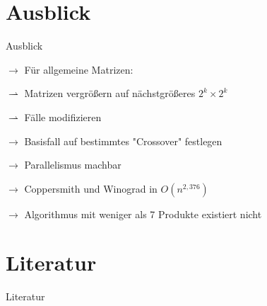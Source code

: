\documentclass[aspectratio=169]{beamer}
\begin{document}
\section{Ausblick}
\begin{frame}{Ausblick}\uncover<+-> {

    $\rightarrow$ Für allgemeine Matrizen:
    
    \qquad $\rightharpoonup$ Matrizen vergrößern auf nächstgrößeres $2^k \times 2^k$
    
    \qquad $\rightharpoonup$ Fälle modifizieren}
    \uncover<+-> {
    
    \bigskip
    $\rightarrow$ Basisfall auf bestimmtes "Crossover" festlegen
    
    \bigskip
    }
    \uncover<+-> {
    
    $\rightarrow$ Parallelismus machbar
    }
    \bigskip
    \uncover<+-> {
    
    $\rightarrow$ Coppersmith und Winograd in $O(n^{2,376})$ \cite{10.5555/1614191}
    }
    \bigskip
    \uncover<+-> {
    
    $\rightarrow$ Algorithmus mit weniger als 7 Produkte existiert nicht \cite{https://doi.org/10.48550/arxiv.math/0407224}}
\end{frame}

\section{Literatur}
\begin{frame}{Literatur}
    \nocite{*}
    
    
\end{frame}
\end{document}
